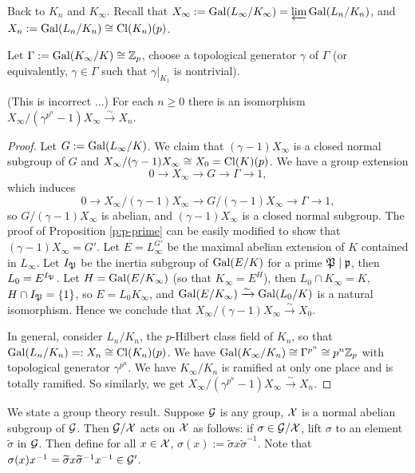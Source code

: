 Back to $K_n$ and $K_\infty$.
Recall that $X_\infty:={\mathrm{Gal}}(L_\infty/K_\infty)=\varprojlim{\mathrm{Gal}}(L_n/K_n)$,
and $X_n:={\mathrm{Gal}}(L_n/K_n)\cong{\mathrm{Cl}}(K_n)(p)$.

Let $\Gamma:={\mathrm{Gal}}(K_\infty/K)\cong{\mathbb {Z}}_p$, choose a topological
generator $\gamma$ of $\Gamma$ (or equivalently, $\gamma\in\Gamma$
such that $\gamma|_{K_1}$ is nontrivial).

\begin{prop}
\label{X-inf-coinv-is-X-n}
(This is incorrect ...)
For each $n\geq 0$ there is an isomorphism
$X_\infty/(\gamma^{p^n}-1)X_\infty\xrightarrow\sim
X_n$.
\end{prop}

\begin{proof}
Let $G:={\mathrm{Gal}}(L_\infty/K)$.
We claim that $(\gamma-1)X_\infty$ is a closed normal subgroup of $G$
and $X_\infty/(\gamma-1)X_\infty\cong X_0={\mathrm{Cl}}(K)(p)$. We have a group extension
$$
0\to X_\infty\to G\to\Gamma\to 1,
$$
which induces
$$
0\to X_\infty/(\gamma-1)X_\infty\to G/(\gamma-1)X_\infty\to\Gamma\to 1,
$$
so $G/(\gamma-1)X_\infty$ is abelian, and $(\gamma-1)X_\infty$
is a closed normal subgroup.
The proof of Proposition \ref{p:p-prime} can be easily modified to
show that $(\gamma-1)X_\infty=G'$.
Let $E=L_\infty^{G'}$ be the maximal abelian extension
of $K$ contained in $L_\infty$. Let $I_{\mathfrak{P}}$ be the inertia
subgroup of ${\mathrm{Gal}}(E/K)$ for a prime ${\mathfrak{P}}\mid{\mathfrak{p}}$,
then $L_0=E^{I_{\mathfrak{P}}}$. Let $H={\mathrm{Gal}}(E/K_\infty)$
(so that $K_\infty=E^H$), then $L_0\cap K_\infty=K$,
$H\cap I_{\mathfrak{P}}=\{1\}$, so $E=L_0K_\infty$,
and ${\mathrm{Gal}}(E/K_\infty)\xrightarrow\sim{\mathrm{Gal}}(L_0/K)$
is a natural isomorphism.
Hence we conclude that $X_\infty/(\gamma-1)X_\infty\xrightarrow\sim X_0$.

In general, consider $L_n/K_n$, the $p$-Hilbert class field of $K_n$,
so that ${\mathrm{Gal}}(L_n/K_n)=:X_n\cong{\mathrm{Cl}}(K_n)(p)$.
We have ${\mathrm{Gal}}(K_\infty/K_n)\cong\Gamma^{p^n}\cong p^n{\mathbb {Z}}_p$
with topological generator $\gamma^{p^n}$.
We have $K_\infty/K_n$ is ramified at only one place and is
totally ramified. So similarly, we get $X_\infty/(\gamma^{p^n}-1)X_\infty\xrightarrow\sim
X_n$.
\end{proof}

We state a group theory result.
Suppose ${\mathcal {G}}$ is any group, ${\mathcal {X}}$ is a normal abelian subgroup of ${\mathcal {G}}$.
Then ${\mathcal {G}}/{\mathcal {X}}$ acts on ${\mathcal {X}}$ as follows:
if $\sigma\in{{\mathcal {G}}/{\mathcal {X}}}$, lift $\sigma$ to an element $\widetilde\sigma$ in ${\mathcal {G}}$.
Then define for all $x\in{\mathcal {X}}$,
$\sigma(x):=\widetilde\sigma x\widetilde\sigma^{-1}$.
Note that $\sigma(x)x^{-1}=\widetilde\sigma x\widetilde{\sigma}^{-1}x^{-1}\in{\mathcal {G}}'$.

